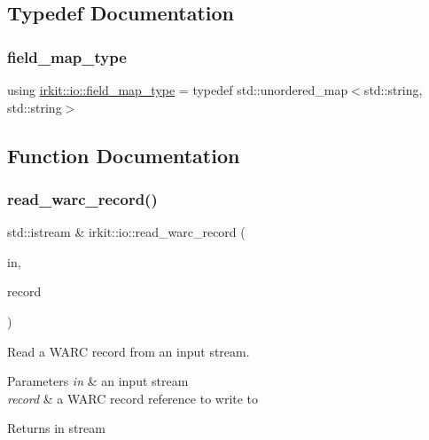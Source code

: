 \subsection{Typedef Documentation}
\mbox{\label{namespaceirkit_1_1io_a3293145f3599deb5abb1ec2ed6d2c2ae}} 
\subsubsection{\texorpdfstring{field\+\_\+map\+\_\+type}{field\_map\_type}}
{\footnotesize\ttfamily using \mbox{\hyperlink{namespaceirkit_1_1io_a3293145f3599deb5abb1ec2ed6d2c2ae}{irkit\+::io\+::field\+\_\+map\+\_\+type}} = typedef std\+::unordered\+\_\+map$<$std\+::string, std\+::string$>$}



\subsection{Function Documentation}
\mbox{\label{namespaceirkit_1_1io_a161dcbb8924839e4923f2df26ebe5ea9}} 
\subsubsection{\texorpdfstring{read\+\_\+warc\+\_\+record()}{read\_warc\_record()}}
{\footnotesize\ttfamily std\+::istream \& irkit\+::io\+::read\+\_\+warc\+\_\+record (\begin{DoxyParamCaption}\item[{std\+::istream \&}]{in,  }\item[{\mbox{\hyperlink{classirkit_1_1io_1_1warc__record}{warc\+\_\+record}} \&}]{record }\end{DoxyParamCaption})\hspace{0.3cm}{\ttfamily [inline]}}



Read a W\+A\+RC record from an input stream. 


\begin{DoxyParams}{Parameters}
{\em in} & an input stream \\
\hline
{\em record} & a W\+A\+RC record reference to write to \\
\hline
\end{DoxyParams}
\begin{DoxyReturn}{Returns}
{\ttfamily in} stream 
\end{DoxyReturn}
